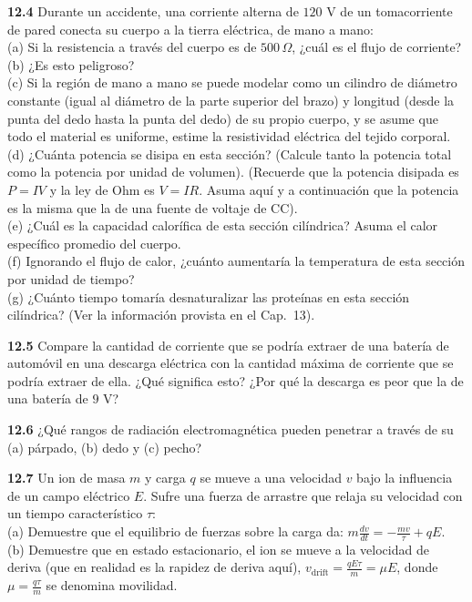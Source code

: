 \documentclass[12pt]{book}
\begin{document}
\noindent \textbf{12.4} Durante un accidente, una corriente alterna de $120\text{ V}$ de un tomacorriente de pared conecta su cuerpo a la tierra eléctrica, de mano a mano: \\
(a) Si la resistencia a través del cuerpo es de $500\,\Omega$, ¿cuál es el flujo de corriente? \\
(b) ¿Es esto peligroso? \\
(c) Si la región de mano a mano se puede modelar como un cilindro de diámetro constante (igual al diámetro de la parte superior del brazo) y longitud (desde la punta del dedo hasta la punta del dedo) de su propio cuerpo, y se asume que todo el material es uniforme, estime la resistividad eléctrica del tejido corporal. \\
(d) ¿Cuánta potencia se disipa en esta sección? (Calcule tanto la potencia total como la potencia por unidad de volumen). (Recuerde que la potencia disipada es $P = I V$ y la ley de Ohm es $V = I R$. Asuma aquí y a continuación que la potencia es la misma que la de una fuente de voltaje de CC). \\
(e) ¿Cuál es la capacidad calorífica de esta sección cilíndrica? Asuma el calor específico promedio del cuerpo. \\
(f) Ignorando el flujo de calor, ¿cuánto aumentaría la temperatura de esta sección por unidad de tiempo? \\
(g) ¿Cuánto tiempo tomaría desnaturalizar las proteínas en esta sección cilíndrica? (Ver la información provista en el Cap.~13).

\noindent \textbf{12.5} Compare la cantidad de corriente que se podría extraer de una batería de automóvil en una descarga eléctrica con la cantidad máxima de corriente que se podría extraer de ella. ¿Qué significa esto? ¿Por qué la descarga es peor que la de una batería de $9\text{ V}$?

\noindent \textbf{12.6} ¿Qué rangos de radiación electromagnética pueden penetrar a través de su (a) párpado, (b) dedo y (c) pecho?

\noindent \textbf{12.7} Un ion de masa $m$ y carga $q$ se mueve a una velocidad $v$ bajo la influencia de un campo eléctrico $E$. Sufre una fuerza de arrastre que relaja su velocidad con un tiempo característico $\tau$: \\
(a) Demuestre que el equilibrio de fuerzas sobre la carga da: $m \frac{dv}{dt} = -\frac{m v}{\tau} + qE$. \\
(b) Demuestre que en estado estacionario, el ion se mueve a la velocidad de deriva (que en realidad es la rapidez de deriva aquí), $v_{\text{drift}} = \frac{q E \tau}{m} = \mu E$, donde $\mu = \frac{q \tau}{m}$ se denomina movilidad.
\end{document}
